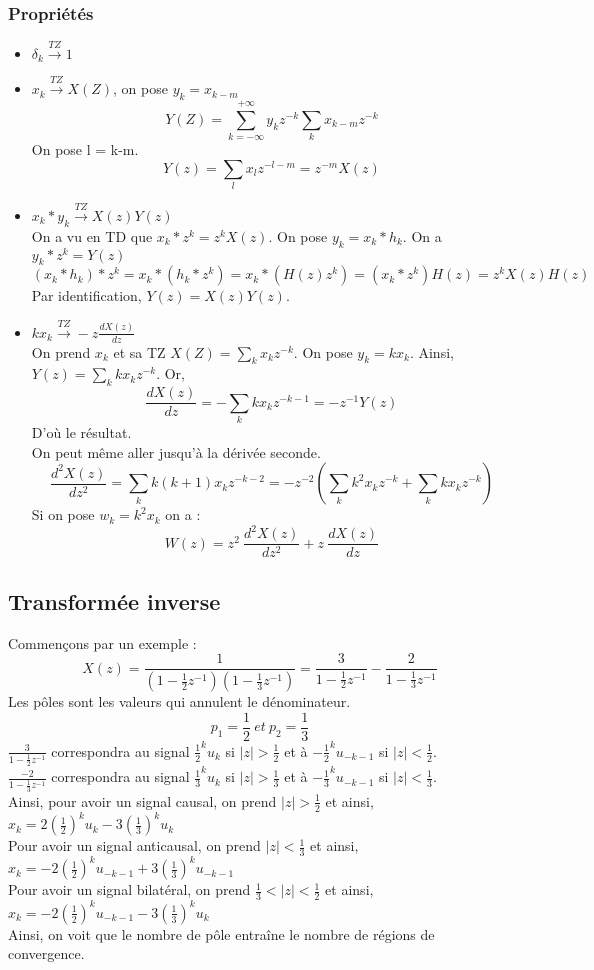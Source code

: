 \subsubsection*{Propriétés}
\begin{itemize}
\item $\delta_k \xrightarrow{TZ} 1$
\item $x_k \xrightarrow{TZ} X(Z)$, on pose $y_k = x_{k-m}$ 
\[Y(Z) = \sum_{k=-\infty}^{+\infty} y_k z^{-k} \sum_{k} x_{k-m} z^{-k}\]
On pose l = k-m.
\[Y(z) = \sum_{l} x_{l} z^{-l-m} = z^{-m} X(z)\]
\item $x_k * y_k \xrightarrow{TZ} X(z)Y(z)$ \\
On a vu en TD que $x_k *z^k = z^k X(z)$. On pose $y_k = x_k * h_k$. On a $y_k * z^k = Y(z)$ \\
\[(x_k * h_k)* z^k = x_k * (h_k * z^k) = x_k * (H(z)z^k) = (x_k * z^k)H(z) = z^k X(z)H(z)\]
Par identification, $Y(z)=X(z)Y(z)$.
\item $kx_k \xrightarrow{TZ} -z \frac{dX(z)}{dz}$ \\
On prend $x_k$ et sa TZ $X(Z)=\sum_k x_k z^{-k}$. On pose $y_k = kx_k$. Ainsi, $Y(z)=\sum_k kx_kz^{-k}$. Or, 
\[\frac{dX(z)}{dz}=-\sum_k kx_k z^{-k-1} = -z^{-1} Y(z)\]
D'où le résultat. \\
On peut même aller jusqu'à la dérivée seconde. 
\[\frac{d^2 X(z)}{dz^2}=\sum_k k(k+1)x_k z^{-k-2} = -z^{-2} \left(\sum_k k^2 x_k z^{-k} + \sum_k kx_k z^{-k} \right)\]
Si on pose $w_k=k^2x_k$ on a : 
\[W(z) = z^2\ \frac{d^2 X(z)}{dz^2} + z\ \frac{dX(z)}{dz}\]
\end{itemize}

\subsection{Transformée inverse}
Commençons par un exemple : \[X(z) = \frac{1}{(1-\frac{1}{2} z^{-1})(1-\frac{1}{3} z^{-1})}=\frac{3}{1-\frac{1}{2} z^{-1}} - \frac{2}{1-\frac{1}{3} z^{-1}}\]
Les pôles sont les valeurs qui annulent le dénominateur. \[p_1 = \frac{1}{2}\ et\ p_2 = \frac{1}{3}\]
$\frac{3}{1-\frac{1}{2} z^{-1}}$ correspondra au signal $\frac{1}{2}^k u_k$ si $|z| > \frac{1}{2}$ et à $-\frac{1}{2}^k u_{-k-1}$ si $|z| < \frac{1}{2}$. \\
$\frac{-2}{1-\frac{1}{3} z^{-1}}$ correspondra au signal $\frac{1}{3}^k u_k$ si $|z| > \frac{1}{3}$ et à $-\frac{1}{3}^k u_{-k-1}$ si $|z| < \frac{1}{3}$. \\
Ainsi, pour avoir un signal causal, on prend $|z| > \frac{1}{2}$ et ainsi, $x_k = 2\left(\frac{1}{2}\right)^k u_k -3\left(\frac{1}{3}\right)^k u_k$ \\
Pour avoir un signal anticausal, on prend $|z| < \frac{1}{3}$ et ainsi, $x_k = -2\left(\frac{1}{2}\right)^k u_{-k-1} +3 \left(\frac{1}{3}\right)^k u_{-k-1}$ \\
Pour avoir un signal bilatéral, on prend $\frac{1}{3}<|z| < \frac{1}{2}$ et ainsi, $x_k = -2\left(\frac{1}{2}\right)^k u_{-k-1} -3\left(\frac{1}{3}\right)^k u_k$ \\
Ainsi, on voit que le nombre de pôle entraîne le nombre de régions de convergence.


